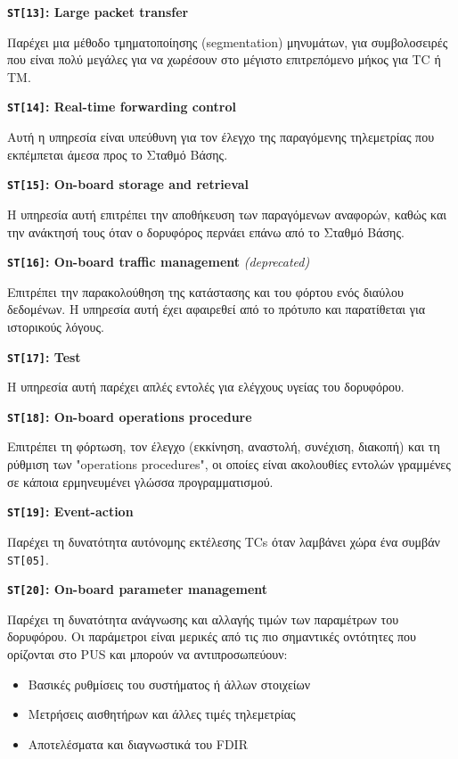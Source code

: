\documentclass[a4paper,nobib]{tufte-book}
\begin{document}
\begin{compactitem}
		\item \textbf{\texttt{ST[13]}: Large packet transfer}
		
		Παρέχει μια μέθοδο τμηματοποίησης (segmentation) μηνυμάτων, για συμβολοσειρές που είναι πολύ μεγάλες για να χωρέσουν στο μέγιστο επιτρεπόμενο μήκος για \ac{TC} ή \ac{TM}.
		
		\item \textbf{\texttt{ST[14]}: Real-time forwarding control}
		
		Αυτή η υπηρεσία είναι υπεύθυνη για τον έλεγχο της παραγόμενης τηλεμετρίας που εκπέμπεται άμεσα προς το Σταθμό Βάσης.
		
		\item \textbf{\texttt{ST[15]}: On-board storage and retrieval}
		
		Η υπηρεσία αυτή επιτρέπει την αποθήκευση των παραγόμενων αναφορών, καθώς και την ανάκτησή τους όταν ο δορυφόρος περνάει επάνω από το Σταθμό Βάσης.
		
		\item \textbf{\texttt{ST[16]}: On-board traffic management} \emph{(deprecated)}
		
		Επιτρέπει την παρακολούθηση της κατάστασης και του φόρτου ενός διαύλου δεδομένων. Η υπηρεσία αυτή έχει αφαιρεθεί από το πρότυπο και παρατίθεται για ιστορικούς λόγους.
		
		\item \textbf{\texttt{ST[17]}: Test}
		
		Η υπηρεσία αυτή παρέχει απλές εντολές για ελέγχους υγείας του δορυφόρου.
		
		\item \textbf{\texttt{ST[18]}: On-board operations procedure}
		
		Επιτρέπει τη φόρτωση, τον έλεγχο (εκκίνηση, αναστολή, συνέχιση, διακοπή) και τη ρύθμιση των "operations procedures", οι οποίες είναι ακολουθίες εντολών γραμμένες σε κάποια ερμηνευμένει γλώσσα προγραμματισμού.
		
		\item \textbf{\texttt{ST[19]}: Event-action}
		
		Παρέχει τη δυνατότητα αυτόνομης εκτέλεσης \acp{TC} όταν λαμβάνει χώρα ένα συμβάν \texttt{ST[05]}.
		
		\item \textbf{\texttt{ST[20]}: On-board parameter management}
		
		Παρέχει τη δυνατότητα ανάγνωσης και αλλαγής τιμών των παραμέτρων του δορυφόρου. Οι παράμετροι είναι μερικές από τις πιο σημαντικές οντότητες που ορίζονται στο \acs{PUS} και μπορούν να αντιπροσωπεύουν:
		\begin{itemize}
			\item Βασικές ρυθμίσεις του συστήματος ή άλλων στοιχείων
			\item Μετρήσεις αισθητήρων και άλλες τιμές τηλεμετρίας
			\item Αποτελέσματα και διαγνωστικά του \ac{FDIR}
		\end{itemize}
		

\end{compactitem}
\end{document}
